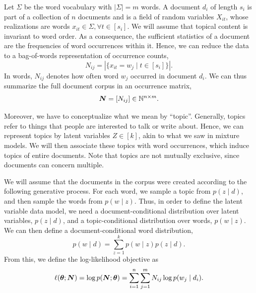 Let $\Sigma$ be the word vocabulary with $|\Sigma|=m$ words. A document $d_i$ of length $s_i$ is
part of a collection of $n$ documents and is a field of random variables $X_{it}$, whose
realizations are words $x_{it} \in \Sigma, \forall t \in [s_i]$. We will assume that topical
content is invariant to word order. As a consequence, the sufficient statistics of a document are the frequencies of word
occurrences within it. Hence, we can reduce the data to a bag-of-words representation of occurrence
counts, \[
    N_{ij} = | \{ x_{it} = w_j \mid t \in [s_i] \} |.
\]
In words, $N_{ij}$ denotes how often word $w_j$ occurred in document $d_i$. We can thus summarize
the full document corpus in an occurrence matrix, \[
    \bm{N} = [N_{ij}] \in \mathbb{N}^{n \times m}.
\]

Moreover, we have to conceptualize what we mean by ``topic''. Generally, topics refer to things
that people are interested to talk or write about. Hence, we can represent topics by latent
variables $Z \in [k]$, akin to what we saw in mixture models. We will then associate these topics
with word occurrences, which induce topics of entire documents. Note that topics are not mutually exclusive, since documents can concern multiple.

We will assume that the documents in the corpus were created according to the following generative
process. For each word, we sample a topic from $p(z
    \mid d)$, and then sample the words from $p(w \mid z)$. Thus, in order to define the latent
variable data model, we need a document-conditional distribution over latent variables, $p(z \mid
    d)$, and a topic-conditional distribution over words, $p(w \mid z)$. We can then define a
document-conditional word distribution, \[
    p(w \mid d) = \sum_{z=1}^{k} p(w \mid z) p(z \mid d).
\]
From this, we define the log-likelihood objective as \[
    \ell(\bm{\theta}; \bm{N}) = \log p(\bm{N}; \bm{\theta}) = \sum_{i=1}^{n} \sum_{j=1}^{m} N_{ij} \log p(w_j \mid d_i).
\]

